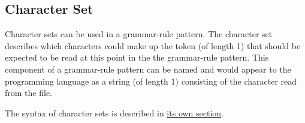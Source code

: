 
\subsection{Character Set}
{
	Character sets can be used in a grammar-rule pattern.
	The character set describes which characters could make up the
	token (of length 1) that should be
	expected
	to be read at this point in the the grammar-rule pattern.
	This component of a grammar-rule pattern can be named and would appear to
	the programming language as a string (of length 1) consisting of
	the character read from the file.
	
	The syntax of character sets is described in
	\hyperref[sec:charset]{its own section}.
}
